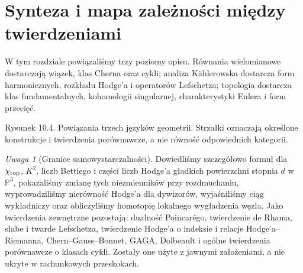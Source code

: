 \documentclass[11pt,a4paper,openany]{report}
\numberwithin{equation}{section}
\theoremstyle{plain}
\theoremstyle{definition}
\theoremstyle{remark}
\newtheorem{uwaga}[twierdzenie]{Uwaga}
\newcommand{\PP}{\mathbb P}
\begin{document}
\section{Synteza i mapa zależności między twierdzeniami}
\label{sec:ga10-koniec}

W tym rozdziale powiązaliśmy trzy poziomy opisu.
Równania wielomianowe dostarczają wiązek, klas Cherna
oraz cykli; analiza Kählerowska dostarcza form
harmonicznych, rozkładu Hodge'a i operatorów Lefschetza;
topologia dostarcza klas fundamentalnych, kohomologii
singularnej, charakterystyki Eulera i form przecięć.

\begin{center}

{\small Rysunek 10.4. Powiązania trzech języków geometrii.
Strzałki oznaczają określone konstrukcje i twierdzenia
porównawcze, a nie równość odpowiednich kategorii.}\par
\end{center}

\begin{uwaga}[Granice samowystarczalności]
Dowiedliśmy szczegółowo formuł dla $\chi_{\rm top}$,
$K^2$, liczb Bettiego i części liczb Hodge'a
gładkich powierzchni stopnia $d$ w $\PP^3$,
pokazaliśmy zmianę tych niezmienników przy rozdmuchaniu,
wyprowadziliśmy nierówność Hodge'a dla dywizorów,
wyjaśniliśmy ciąg wykładniczy oraz obliczyliśmy
homotopię lokalnego wygładzenia węzła.
Jako twierdzenia zewnętrzne pozostają: dualność Poincarégo,
twierdzenie de Rhama, słabe i twarde Lefschetza,
twierdzenie Hodge'a o indeksie i relacje Hodge'a--Riemanna,
Chern--Gauss--Bonnet, GAGA, Dolbeault i ogólne twierdzenia
porównawcze o klasach cykli. Zostały one użyte z jawnymi
założeniami, a nie ukryte w rachunkowych przeskokach.
\end{uwaga}

\end{document}
